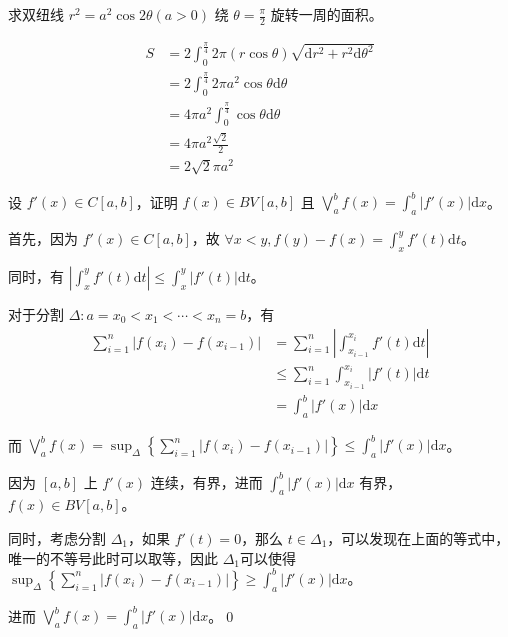 \begin{ques}
	求双纽线 $\displaystyle r^{2} =a^{2}\cos 2\theta ( a >0)$ 绕 $\displaystyle \theta =\frac{\pi }{2}$ 旋转一周的面积。
\end{ques}
\begin{align*}
	S & =2\int _{0}^{\frac{\pi }{4}} 2\pi ( r\cos \theta )\sqrt{\mathrm{d} r^{2} +r^{2}\mathrm{d} \theta ^{2}}\\
	& =2\int _{0}^{\frac{\pi }{4}} 2\pi a^{2}\cos \theta \mathrm{d} \theta \\
	& =4\pi a^{2}\int _{0}^{\frac{\pi }{4}}\cos \theta \mathrm{d} \theta \\
	& =4\pi a^{2}\frac{\sqrt{2}}{2}\\
	& =2\sqrt{2} \pi a^{2}
\end{align*}




\begin{ques}
	设 $\displaystyle f'( x) \in C[ a,b]$，证明 $\displaystyle f( x) \in BV[ a,b]$ 且 $\displaystyle \bigvee _{a}^{b} f( x) =\int _{a}^{b} |f'( x) |\mathrm{d} x$。
\end{ques}



首先，因为 $\displaystyle f'( x) \in C[ a,b]$，故 $\displaystyle \forall x< y,f( y) -f( x) =\int _{x}^{y} f'( t)\mathrm{d} t$。

同时，有 $\displaystyle \left| \int _{x}^{y} f'( t)\mathrm{d} t\right| \leqslant \int _{x}^{y} |f'( t) |\mathrm{d} t$。

对于分割 $\displaystyle \Delta :a=x_{0} < x_{1} < \cdots < x_{n} =b$，有
\begin{align*}
	\sum _{i=1}^{n} |f( x_{i}) -f( x_{i-1}) | & =\sum _{i=1}^{n}\left| \int _{x_{i-1}}^{x_{i}} f'( t)\mathrm{d} t\right| \\
	& \leqslant \sum _{i=1}^{n}\int _{x_{i-1}}^{x_{i}} |f'( t) |\mathrm{d} t\\
	& =\int _{a}^{b} |f'( x) |\mathrm{d} x
\end{align*}

而 $\displaystyle \bigvee _{a}^{b} f( x) =\sup _{\Delta }\left\{\sum _{i=1}^{n} |f( x_{i}) -f( x_{i-1}) |\right\} \leqslant \int _{a}^{b} |f'( x) |\mathrm{d} x$。

因为 $\displaystyle [ a,b]$ 上 $\displaystyle f'( x)$ 连续，有界，进而 $\displaystyle \int _{a}^{b} |f'( x) |\mathrm{d} x$ 有界，$\displaystyle f( x) \in BV[ a,b]$。

同时，考虑分割 $\displaystyle \Delta _{1}$，如果 $\displaystyle f'( t) =0$，那么 $\displaystyle t\in \Delta _{1}$，可以发现在上面的等式中，唯一的不等号此时可以取等，因此 $\displaystyle \Delta _{1}$可以使得 $\displaystyle \sup _{\Delta }\left\{\sum _{i=1}^{n} |f( x_{i}) -f( x_{i-1}) |\right\} \geqslant \int _{a}^{b} |f'( x) |\mathrm{d} x$。

进而 $\displaystyle \bigvee _{a}^{b} f( x) =\int _{a}^{b} |f'( x) |\mathrm{d} x$。\qed 
\ifx\allfiles\undefined

\fi